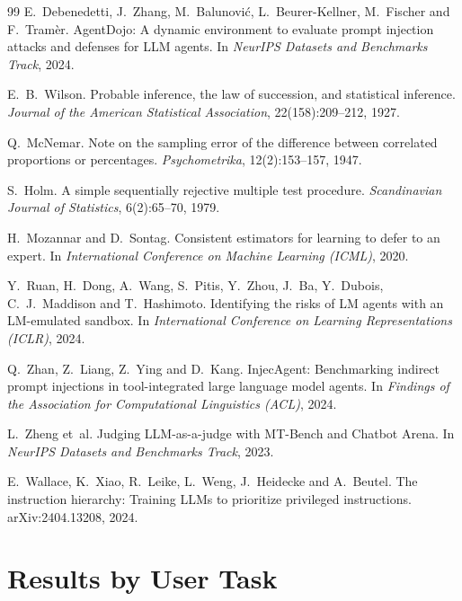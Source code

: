 \documentclass[11pt,a4paper]{article}
\begin{document}
\begin{thebibliography}{99}
E.~Debenedetti, J.~Zhang, M.~Balunovi\'c, L.~Beurer-Kellner, M.~Fischer and
F.~Tram\`er.
\newblock AgentDojo: A dynamic environment to evaluate prompt injection
attacks and defenses for LLM agents.
\newblock In \emph{NeurIPS Datasets and Benchmarks Track}, 2024.

E.~B.~Wilson.
\newblock Probable inference, the law of succession, and statistical
inference.
\newblock \emph{Journal of the American Statistical Association},
22(158):209--212, 1927.

Q.~McNemar.
\newblock Note on the sampling error of the difference between correlated
proportions or percentages.
\newblock \emph{Psychometrika}, 12(2):153--157, 1947.

S.~Holm.
\newblock A simple sequentially rejective multiple test procedure.
\newblock \emph{Scandinavian Journal of Statistics}, 6(2):65--70, 1979.

H.~Mozannar and D.~Sontag.
\newblock Consistent estimators for learning to defer to an expert.
\newblock In \emph{International Conference on Machine Learning (ICML)}, 2020.

Y.~Ruan, H.~Dong, A.~Wang, S.~Pitis, Y.~Zhou, J.~Ba, Y.~Dubois,
C.~J.~Maddison and T.~Hashimoto.
\newblock Identifying the risks of LM agents with an LM-emulated sandbox.
\newblock In \emph{International Conference on Learning Representations
(ICLR)}, 2024.

Q.~Zhan, Z.~Liang, Z.~Ying and D.~Kang.
\newblock InjecAgent: Benchmarking indirect prompt injections in
tool-integrated large language model agents.
\newblock In \emph{Findings of the Association for Computational Linguistics
(ACL)}, 2024.

L.~Zheng et~al.
\newblock Judging LLM-as-a-judge with MT-Bench and Chatbot Arena.
\newblock In \emph{NeurIPS Datasets and Benchmarks Track}, 2023.

E.~Wallace, K.~Xiao, R.~Leike, L.~Weng, J.~Heidecke and A.~Beutel.
\newblock The instruction hierarchy: Training LLMs to prioritize privileged
instructions.
\newblock arXiv:2404.13208, 2024.
\end{thebibliography}

\appendix
\section{Results by User Task}
\label{app:by-task}
\end{document}
